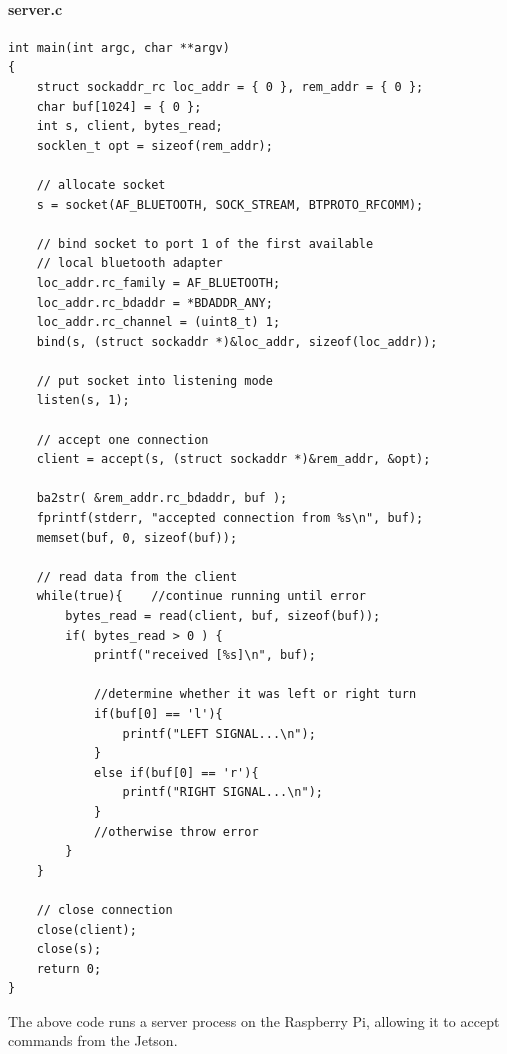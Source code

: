 \documentclass[onecolumn, draftclsnofoot,10pt, compsoc]{IEEEtran}
\begin{document}
\paragraph{server.c}
\begin{verbatim}
int main(int argc, char **argv)
{
    struct sockaddr_rc loc_addr = { 0 }, rem_addr = { 0 };
    char buf[1024] = { 0 };
    int s, client, bytes_read;
    socklen_t opt = sizeof(rem_addr);

    // allocate socket
    s = socket(AF_BLUETOOTH, SOCK_STREAM, BTPROTO_RFCOMM);

    // bind socket to port 1 of the first available 
    // local bluetooth adapter
    loc_addr.rc_family = AF_BLUETOOTH;
    loc_addr.rc_bdaddr = *BDADDR_ANY;
    loc_addr.rc_channel = (uint8_t) 1;
    bind(s, (struct sockaddr *)&loc_addr, sizeof(loc_addr));

    // put socket into listening mode
    listen(s, 1);

    // accept one connection
    client = accept(s, (struct sockaddr *)&rem_addr, &opt);

    ba2str( &rem_addr.rc_bdaddr, buf );
    fprintf(stderr, "accepted connection from %s\n", buf);
    memset(buf, 0, sizeof(buf));

    // read data from the client
    while(true){    //continue running until error
        bytes_read = read(client, buf, sizeof(buf));
        if( bytes_read > 0 ) {
            printf("received [%s]\n", buf);

            //determine whether it was left or right turn
            if(buf[0] == 'l'){
                printf("LEFT SIGNAL...\n");
            }
            else if(buf[0] == 'r'){
                printf("RIGHT SIGNAL...\n");
            }
            //otherwise throw error
        }
    }
    
    // close connection
    close(client);
    close(s);
    return 0;
}
\end{verbatim}
The above code runs a server process on the Raspberry Pi, allowing it to accept commands from the Jetson.
\end{document}

